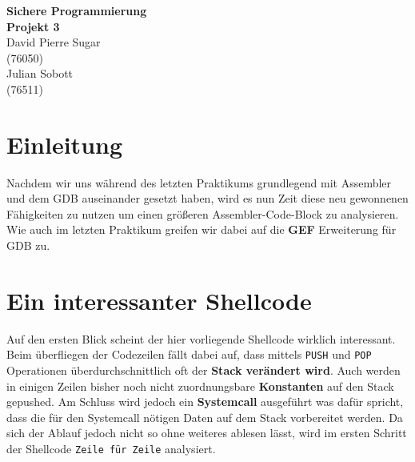\documentclass[12pt]{article}
\begin{document}
\begin{center}
  \textbf{\LARGE Sichere Programmierung} \\[1ex]%
  \textbf{\Large Projekt 3}\\[2ex] %
  David Pierre Sugar\\ %
  (76050) \\ %
  Julian Sobott\\ %
  (76511) \\ %
  
\end{center}

\section{Einleitung}
Nachdem wir uns während des letzten Praktikums grundlegend mit Assembler und dem GDB auseinander gesetzt haben, wird es nun Zeit diese neu gewonnenen Fähigkeiten zu nutzen um einen größeren Assembler-Code-Block zu analysieren.
\newline
\newline
Wie auch im letzten Praktikum greifen wir dabei auf die \textbf{GEF} Erweiterung für GDB zu.

\section{Ein interessanter Shellcode}
Auf den ersten Blick scheint der hier vorliegende Shellcode wirklich interessant. Beim überfliegen der Codezeilen fällt dabei auf, dass mittels \texttt{PUSH} und \texttt{POP} Operationen überdurchschnittlich oft der \textbf{Stack verändert wird}. Auch werden in einigen Zeilen bisher noch nicht zuordnungsbare \textbf{Konstanten} auf den Stack gepushed. Am Schluss wird jedoch ein \textbf{Systemcall} ausgeführt was dafür spricht, dass die für den Systemcall nötigen Daten auf dem Stack vorbereitet werden.
\newline
\newline
Da sich der Ablauf jedoch nicht so ohne weiteres ablesen lässt, wird im ersten Schritt der Shellcode \texttt{Zeile für Zeile} analysiert.

\end{document}
